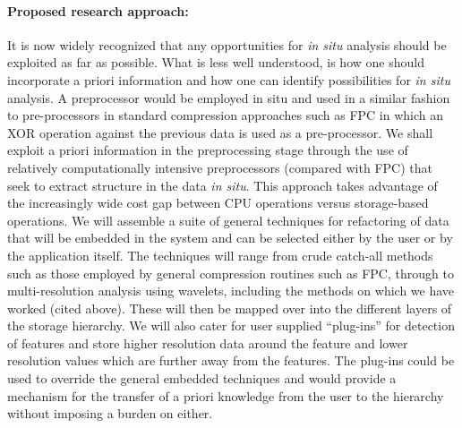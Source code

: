 \paragraph{Proposed research approach:} It is now widely recognized that any
opportunities for {\em in situ} analysis should be exploited as far as
possible. What is less well understood, is how one should incorporate a priori
information and how one can identify possibilities for {\em in situ} analysis.
A preprocessor would be employed in situ and used in a similar fashion to
pre-processors in standard compression approaches such as FPC
\cite{BurtscherFPC} in which an XOR operation against the previous data is used
as a pre-processor.  We shall exploit a priori information in the preprocessing
stage through the use of relatively computationally intensive preprocessors
(compared with FPC) that seek to extract structure in the data {\em in situ}.
This approach takes advantage of the increasingly wide cost gap between CPU
operations versus storage-based operations. 
We will assemble a suite of general techniques for refactoring of data that
will be embedded in the system and can be selected either by the user or by the
application itself. The techniques will range from crude catch-all methods such
as those employed by general compression routines such as FPC, through to
multi-resolution analysis using wavelets, including the methods on which we
have worked (cited above).  These will then be mapped over into the different
layers of the storage hierarchy.  We will also cater for user supplied
``plug-ins'' for detection of features and store higher resolution data around
the feature and lower resolution values which are further away from the
features. The plug-ins could be used to override the general embedded
techniques and would provide a mechanism for the transfer of a priori knowledge
from the user to the hierarchy without imposing a burden on either. 

